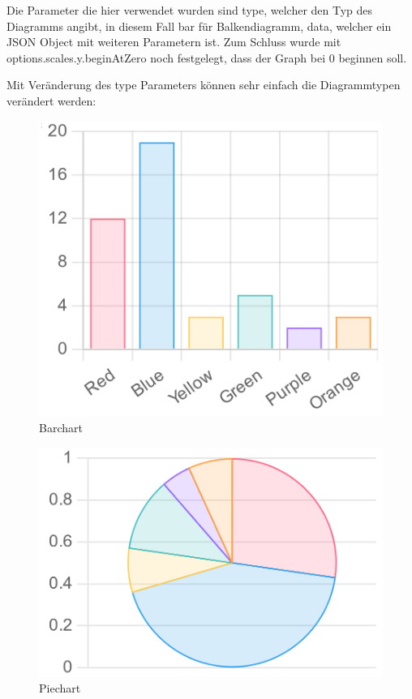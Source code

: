Die Parameter die hier verwendet wurden sind type, welcher den Typ des Diagramms angibt,
in diesem Fall bar für Balkendiagramm, data, welcher ein JSON Object mit weiteren Parametern ist.
Zum Schluss wurde mit options.scales.y.beginAtZero noch festgelegt, dass der Graph bei 0 beginnen soll.

Mit Veränderung des type Parameters können sehr einfach die Diagrammtypen verändert werden:
\begin{figure}[H]
    \centering
    \includegraphics[scale=0.3]{pics/barChart.png}
    \caption{Barchart}
\end{figure}
\begin{figure}[H]
    \centering
    \includegraphics[scale=0.3]{pics/pieChart.png}
    \caption{Piechart}
\end{figure}
